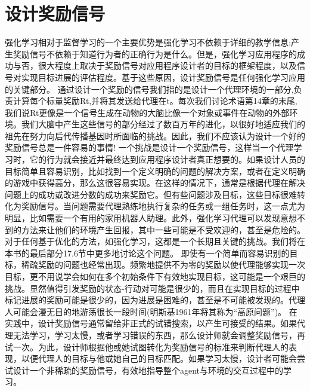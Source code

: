 \section{设计奖励信号}


强化学习相对于监督学习的一个主要优势是强化学习不依赖于详细的教学信息:产生奖励信号不依赖于知道行为者的正确行为是什么。但是，强化学习应用程序的成功与否，很大程度上取决于奖励信号对应用程序设计者的目标的框架程度，以及信号对实现目标进展的评估程度。基于这些原因，设计奖励信号是任何强化学习应用的关键部分。
通过设计一个奖励的信号我们指的是设计一个代理环境的一部分,负责计算每个标量奖励Rt,并将其发送给代理在t。每次我们讨论术语第14章的末尾,我们说Rt更像是一个信号生成在动物的大脑比像一个对象或事件在动物的外部环境。我们大脑中产生这些信号的部分经过了数百万年的进化，以很好地适应我们的祖先在努力向后代传播基因时所面临的挑战。因此，我们不应该认为设计一个好的奖励信号总是一件容易的事情!
一个挑战是设计一个奖励信号，这样当一个代理学习时，它的行为就会接近并最终达到应用程序设计者真正想要的。如果设计人员的目标简单且容易识别，比如找到一个定义明确的问题的解决方案，或者在定义明确的游戏中获得高分，那么这很容易实现。在这样的情况下，通常是根据代理在解决问题上的成功或改进分数的成功来奖励它。但有些问题涉及目标，这些目标很难转化为奖励信号。当问题需要代理熟练地执行复杂的任务或一组任务时，这一点尤为明显，比如需要一个有用的家用机器人助理。此外，强化学习代理可以发现意想不到的方法来让他们的环境产生回报，其中一些可能是不受欢迎的，甚至是危险的。对于任何基于优化的方法，如强化学习，这都是一个长期且关键的挑战。我们将在本书的最后部分17.6节中更多地讨论这个问题。
即使有一个简单而容易识别的目标，稀疏奖励的问题也经常出现。频繁地提供不为零的奖励以使代理能够实现一次目标，更不用说学会如何在多个初始条件下有效地实现目标，这可能是一个艰巨的挑战。显然值得引发奖励的状态-行动对可能是很少的，而且在实现目标的过程中标记进展的奖励可能是很少的，因为进展是困难的，甚至是不可能被发现的。代理人可能会漫无目的地游荡很长一段时间(明斯基1961年将其称为“高原问题”)。
在实践中，设计奖励信号通常留给非正式的试错搜索，以产生可接受的结果。如果代理无法学习，学习太慢，或者学习错误的东西，那么设计师就会调整奖励信号，再试一次。为此，设计师根据他或她试图转化为奖励信号的标准来判断代理人的表现，以便代理人的目标与他或她自己的目标匹配。如果学习太慢，设计者可能会尝试设计一个非稀疏的奖励信号，有效地指导整个agent与环境的交互过程中的学习。


